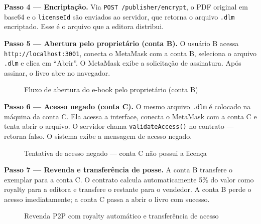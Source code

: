 \documentclass[12pt]{article}
\begin{document}
\textbf{Passo 4 — Encriptação.} Via \texttt{POST /publisher/encrypt}, o PDF original em base64 e o \texttt{licenseId} são enviados ao servidor, que retorna o arquivo \texttt{.dlm} encriptado. Esse é o arquivo que a editora distribui.

\textbf{Passo 5 — Abertura pelo proprietário (conta B).} O usuário B acessa \texttt{http://localhost:3001}, conecta o MetaMask com a conta B, seleciona o arquivo \texttt{.dlm} e clica em ``Abrir''. O MetaMask exibe a solicitação de assinatura. Após assinar, o livro abre no navegador.

\begin{figure}[H]
\centering
\caption{Fluxo de abertura do e-book pelo proprietário (conta B)}
\label{fig:abertura}
\end{figure}

\textbf{Passo 6 — Acesso negado (conta C).} O mesmo arquivo \texttt{.dlm} é colocado na máquina da conta C. Ela acessa a interface, conecta o MetaMask com a conta C e tenta abrir o arquivo. O servidor chama \texttt{validateAccess()} no contrato — retorna falso. O sistema exibe a mensagem de acesso negado.

\begin{figure}[H]
\centering
\caption{Tentativa de acesso negado — conta C não possui a licença}
\label{fig:negado}
\end{figure}

\textbf{Passo 7 — Revenda e transferência de posse.} A conta B transfere o exemplar para a conta C. O contrato calcula automaticamente 5\% do valor como royalty para a editora e transfere o restante para o vendedor. A conta B perde o acesso imediatamente; a conta C passa a abrir o livro com sucesso.

\begin{figure}[H]
\centering
\caption{Revenda P2P com royalty automático e transferência de acesso}
\label{fig:revenda}
\end{figure}
\end{document}
